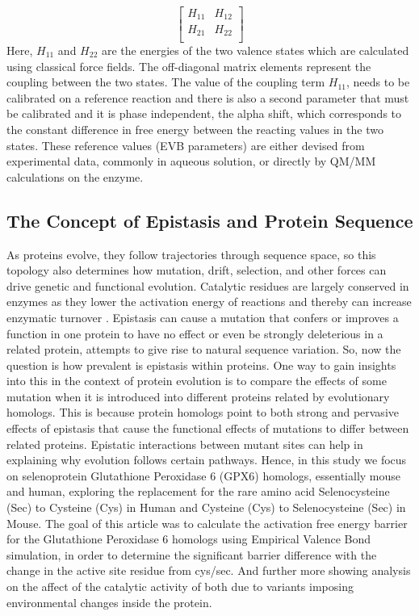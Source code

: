 \documentclass[journal=jacsat,manuscript=article]{achemso}
\begin{document}
{\[ 
  \left[ {\begin{array}{cc}
    H_{11} & H_{12} \\
    H_{21} & H_{22} \\
  \end{array} } \right]
\]
Here, $ H_{11} $ and $ H_{22} $ are the energies of the two valence states which are calculated using classical force fields. The off-diagonal matrix elements represent the coupling between the two states.  The value of the coupling term $ H_{11} $, needs to be calibrated on a reference reaction and there is also a second parameter that must be calibrated and it is phase independent, \cite{Oanca2023} the alpha shift, which corresponds to the constant difference in free energy between the reacting values in the two states. \cite{Oanca2023} These reference values (EVB parameters) are either devised from experimental data, commonly in aqueous solution, or directly by QM/MM calculations on the enzyme. 

\subsection{The Concept of Epistasis and Protein Sequence}

As proteins evolve, they follow trajectories through sequence space, so this topology also determines how mutation, drift, selection, and other forces can drive genetic and functional evolution. Catalytic residues are largely conserved in enzymes as they lower the activation energy of reactions and thereby can increase enzymatic turnover \cite{Rees2024}. Epistasis can cause a mutation that confers or improves a function in one protein to have no effect or even be strongly deleterious in a related protein, attempts to give rise to natural sequence variation.\cite{Starr2016} So, now the question is how prevalent is epistasis within proteins.\cite{Starr2016} One way to gain insights into this in the context of protein evolution is to compare the effects of some mutation when it is introduced into different proteins related by evolutionary homologs.\cite{Starr2016} This is because protein homologs point to both strong and pervasive effects of epistasis that cause the functional effects of mutations to differ between related proteins.\cite{Starr2016} Epistatic interactions between mutant sites can help in explaining why evolution follows certain pathways.\cite{Storz2018} Hence, in this study we focus on selenoprotein Glutathione Peroxidase 6 (GPX6) homologs, essentially mouse and human, exploring the replacement for the rare amino acid Selenocysteine (Sec) to Cysteine (Cys) in Human and Cysteine (Cys) to Selenocysteine (Sec) in Mouse. The goal of this article was to calculate the activation free energy barrier for the Glutathione Peroxidase 6 homologs using Empirical Valence Bond simulation, in order to determine the significant barrier difference with the change in the active site residue from cys/sec. And further more showing analysis on the affect of the catalytic activity of both due to variants imposing environmental changes inside the protein.

}
\end{document}
